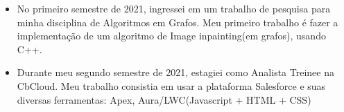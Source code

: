 \documentclass[10pt,a4paper,ragged2e]{altacv}
\begin{document}
{}
\begin{itemize}
\item No primeiro semestre de 2021, ingressei em um trabalho de pesquisa para minha disciplina de Algoritmos em Grafos. Meu primeiro trabalho é fazer a implementação de um algoritmo de Image inpainting(em grafos), usando C++. 
\end{itemize}
\begin{itemize}
\item Durante meu segundo semestre de 2021, estagiei como Analista Treinee na CbCloud. Meu trabalho consistia em usar a 
plataforma Salesforce e suas diversas ferramentas: Apex, Aura/LWC(Javascript + HTML + CSS) 
\end{itemize}

\divider



\end{document}
